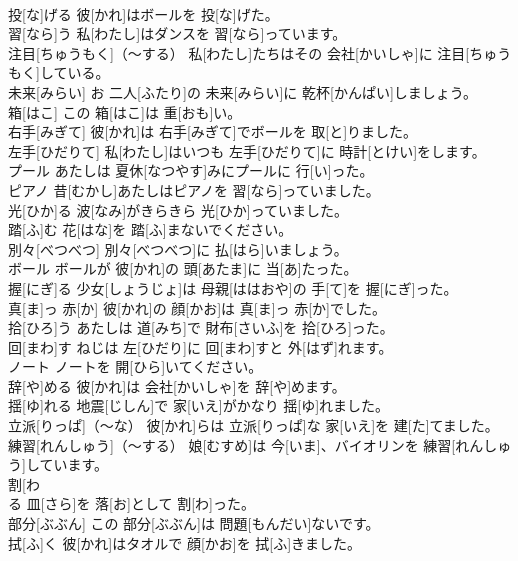 \documentclass[8pt]{extreport}
\begin{document}
\begin{CJK}{UTF8}{min}
\\	投[な]げる	彼[かれ]はボールを 投[な]げた。		
\\	習[なら]う	私[わたし]はダンスを 習[なら]っています。		
\\	注目[ちゅうもく]（～する）	私[わたし]たちはその 会社[かいしゃ]に 注目[ちゅうもく]している。		
\\	未来[みらい]	お 二人[ふたり]の 未来[みらい]に 乾杯[かんぱい]しましょう。		
\\	箱[はこ]	この 箱[はこ]は 重[おも]い。		
\\	右手[みぎて]	彼[かれ]は 右手[みぎて]でボールを 取[と]りました。		
\\	左手[ひだりて]	私[わたし]はいつも 左手[ひだりて]に 時計[とけい]をします。		
\\	プール	あたしは 夏休[なつやす]みにプールに 行[い]った。		
\\	ピアノ	昔[むかし]あたしはピアノを 習[なら]っていました。		
\\	光[ひか]る	波[なみ]がきらきら 光[ひか]っていました。		
\\	踏[ふ]む	花[はな]を 踏[ふ]まないでください。		
\\	別々[べつべつ]	別々[べつべつ]に 払[はら]いましょう。		
\\	ボール	ボールが 彼[かれ]の 頭[あたま]に 当[あ]たった。		
\\	握[にぎ]る	少女[しょうじょ]は 母親[ははおや]の 手[て]を 握[にぎ]った。		
\\	真[ま]っ 赤[か]	彼[かれ]の 顔[かお]は 真[ま]っ 赤[か]でした。		
\\	拾[ひろ]う	あたしは 道[みち]で 財布[さいふ]を 拾[ひろ]った。		
\\	回[まわ]す	ねじは 左[ひだり]に 回[まわ]すと 外[はず]れます。		
\\	ノート	ノートを 開[ひら]いてください。		
\\	辞[や]める	彼[かれ]は 会社[かいしゃ]を 辞[や]めます。		
\\	揺[ゆ]れる	地震[じしん]で 家[いえ]がかなり 揺[ゆ]れました。		
\\	立派[りっぱ]（～な）	彼[かれ]らは 立派[りっぱ]な 家[いえ]を 建[た]てました。		
\\	練習[れんしゅう]（～する）	娘[むすめ]は 今[いま]、バイオリンを 練習[れんしゅう]しています。		
\\	割[わ
\\	る	皿[さら]を 落[お]として 割[わ]った。		
\\	部分[ぶぶん]	この 部分[ぶぶん]は 問題[もんだい]ないです。		
\\	拭[ふ]く	彼[かれ]はタオルで 顔[かお]を 拭[ふ]きました。		

\end{CJK}
\end{document}
